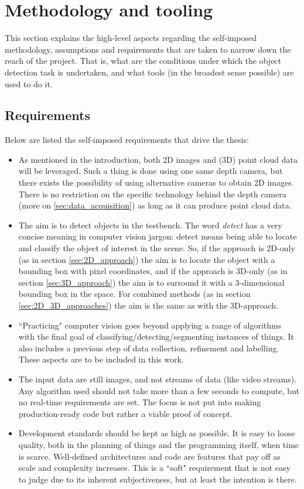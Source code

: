 \documentclass[../main.tex]{subfiles}
\begin{document}
\section{Methodology and tooling} \label{sec:methodology_and_tooling}
This section explains the high-level aspects regarding the self-imposed  methodology, assumptions and requirements that are taken to narrow down the reach of the project. That is, what are the conditions under which the object detection task is undertaken, and what tools (in the broadest sense possible) are used to do it.

\subsection{Requirements}
Below are listed the self-imposed requirements that drive the thesis:
\begin{itemize}
    \item As mentioned in the introduction, both 2D images and (3D) point cloud data will be leveraged. Such a thing is done using one same depth camera, but there exists the possibility of using alternative cameras to obtain 2D images. There is no restriction on the specific technology behind the depth camera (more on \ref{sec:data_acquisition}) as long as it can produce point cloud data.
    \item The aim is to detect objects in the testbench. The word \emph{detect} has a very concise meaning in computer vision jargon: detect means being able to locate and classify the object of interest in the scene. So, if the approach is 2D-only (as in section \ref{sec:2D_approach}) the aim is to locate the object with a bounding box with pixel coordinates, and if the approach is 3D-only (as in section \ref{sec:3D_approach}) the aim is to surround it with a 3-dimensional bounding box in the space. For combined methods (as in section \ref{sec:2D_3D_approaches}) the aim is the same as with the 3D-approach.
    \item ``Practicing" computer vision goes beyond applying a range of algorithms with the final goal of classifying/detecting/segmenting instances of things. It also includes a previous step of data collection, refinement and labelling. These aspects are to be included in this work.
    \item The input data are still images, and not streams of data (like video streams). Any algorithm used should not take more than a few seconds to compute, but no real-time requirements are set. The focus is not put into making production-ready code but rather a viable proof of concept.
    \item Development standards should be kept as high as possible. It is easy to loose quality, both in the planning of things and the programming itself, when time is scarce. Well-defined architectures and code are features that pay off as scale and complexity increases. This is a ``soft" requirement that is not easy to judge due to its inherent subjectiveness, but at least the intention is there.
\end{itemize}
\end{document}
